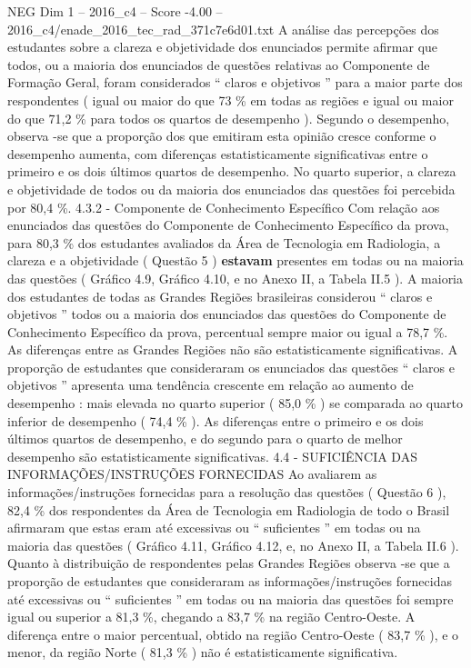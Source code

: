 \begin{textsample}{NEG Dim 1 – 2016\_c4 – Score -4.00 – 2016\_c4/enade\_2016\_tec\_rad\_371c7e6d01.txt}
A análise das percepções dos estudantes sobre a clareza e objetividade dos enunciados permite afirmar que todos, ou a maioria dos enunciados de questões relativas ao Componente de Formação Geral, foram considerados “ claros e objetivos ” para a maior parte dos respondentes ( igual ou maior do que 73 \% em todas as regiões e igual ou maior do que 71,2 \% para todos os quartos de desempenho ).
Segundo o desempenho, observa -se que a proporção dos que emitiram esta opinião cresce conforme o desempenho aumenta, com diferenças estatisticamente significativas entre o primeiro e os dois últimos quartos de desempenho.
No quarto superior, a clareza e objetividade de todos ou da maioria dos enunciados das questões foi percebida por 80,4 \%. 4.3.2 - Componente de Conhecimento Específico Com relação aos enunciados das questões do Componente de Conhecimento Específico da prova, para 80,3 \% dos estudantes avaliados da Área de Tecnologia em Radiologia, a clareza e a objetividade ( Questão 5 ) \textbf{estavam} presentes em todas ou na maioria das questões ( Gráfico 4.9, Gráfico 4.10, e no Anexo II, a Tabela II.5 ).
A maioria dos estudantes de todas as Grandes Regiões brasileiras considerou “ claros e objetivos ” todos ou a maioria dos enunciados das questões do Componente de Conhecimento Específico da prova, percentual sempre maior ou igual a 78,7 \%.
As diferenças entre as Grandes Regiões não são estatisticamente significativas.
A proporção de estudantes que consideraram os enunciados das questões “ claros e objetivos ” apresenta uma tendência crescente em relação ao aumento de desempenho : mais elevada no quarto superior ( 85,0 \% ) se comparada ao quarto inferior de desempenho ( 74,4 \% ).
As diferenças entre o primeiro e os dois últimos quartos de desempenho, e do segundo para o quarto de melhor desempenho são estatisticamente significativas. 4.4 - SUFICIÊNCIA DAS INFORMAÇÕES/INSTRUÇÕES FORNECIDAS Ao avaliarem as informações/instruções fornecidas para a resolução das questões ( Questão 6 ), 82,4 \% dos respondentes da Área de Tecnologia em Radiologia de todo o Brasil afirmaram que estas eram até excessivas ou “ suficientes ” em todas ou na maioria das questões ( Gráfico 4.11, Gráfico 4.12, e, no Anexo II, a Tabela II.6 ).
Quanto à distribuição de respondentes pelas Grandes Regiões observa -se que a proporção de estudantes que consideraram as informações/instruções fornecidas até excessivas ou “ suficientes ” em todas ou na maioria das questões foi sempre igual ou superior a 81,3 \%, chegando a 83,7 \% na região Centro-Oeste.
A diferença entre o maior percentual, obtido na região Centro-Oeste ( 83,7 \% ), e o menor, da região Norte ( 81,3 \% ) não é estatisticamente significativa.

\end{textsample}
